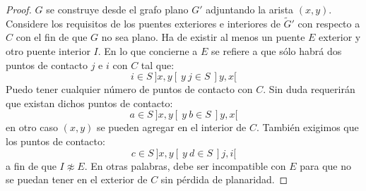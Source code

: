 \documentclass[10pt,a5paper]{book}
\begin{document}
\begin{proof}
$G$ se construye desde el grafo plano $G'$ adjuntando la arista $(x,y)$. Considere los requisitos de los puentes exteriores e interiores de $\widetilde{G}'$ con respecto a $C$ con el fin de que $G$ no sea plano. Ha de existir al menos un puente $E$ exterior y otro puente interior $I$. En lo que concierne a $E$ se refiere a que sólo habrá dos puntos de contacto $j$ e $i$ con $C$ tal que:
$$i \in S\ ]x,y[\ y\ j \in S\ ]y,x[$$
Puedo tener cualquier número de puntos de contacto con $C$. Sin duda requerirán que existan dichos puntos de contacto:
$$a \in S\ ]x,y[\ y\ b \in S\ ]y,x[$$
en otro caso $(x,y)$ se pueden agregar en el interior de $C$. También exigimos que los puntos de contacto:
$$c \in S\ ]x,y[\ y\ d \in S\ ]j,i[$$
a fin de que $I \not \approx E$. En otras palabras, debe ser incompatible con $E$ para que no se puedan tener en el exterior de $C$ sin pérdida de planaridad.


\end{proof}
\end{document}
